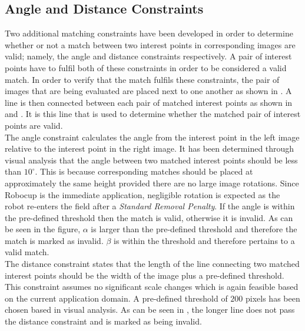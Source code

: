 \documentclass[11pt]{report}
\begin{document}
\subsection{Angle and Distance Constraints}
\label{sec:angleDistanceConstraints}
Two additional matching constraints have been developed in order to determine whether or not a match between two interest points in corresponding images are valid; namely, the angle and distance constraints respectively. A pair of interest points have to fulfil both of these constraints in order to be considered a valid match. In order to verify that the match fulfils these constraints, the pair of images that are being evaluated are placed next to one another as shown in . A line is then connected between each pair of matched interest points as shown in  and . It is this line that is used to determine whether the matched pair of interest points are valid.\\

The angle constraint calculates the angle from the interest point in the left image relative to the interest point in the right image. It has been determined through visual analysis that the angle between two matched interest points should be less than  $10^{\circ}$. This is because corresponding matches should be placed at approximately the same height provided there are no large image rotations. Since Robocup is the immediate application, negligible rotation is expected as the robot re-enters the field after a \textit{Standard Removal Penalty}.
If the angle is within the pre-defined threshold then the match is valid, otherwise it is invalid. As can be seen in the figure, $\alpha$ is larger than the pre-defined threshold and therefore the match is marked as invalid. $\beta$ is within the threshold and therefore pertains to a valid match. \\

The distance constraint states that the length of the line connecting two matched interest points should be the width of the image plus a pre-defined threshold. This constraint assumes no significant scale changes which is again feasible based on the current application domain. A pre-defined threshold of $200$ pixels has been chosen based in visual analysis. As can be seen in , the longer line does not pass the distance constraint and is marked as being invalid.\\
\end{document}
